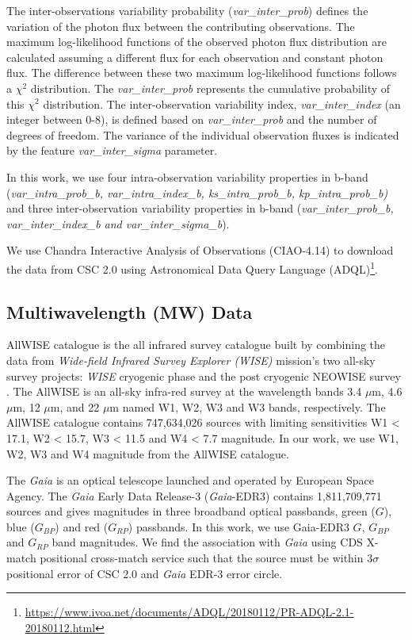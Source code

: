 \documentclass[fleqn,usenatbib]{mnras}
\begin{document}
 The inter-observations variability probability ({\em var\_inter\_prob}) 
 defines the variation of the photon flux between the contributing observations. The maximum log-likelihood functions of the observed photon flux distribution are calculated assuming a different flux for each observation and constant photon flux. The difference between these two maximum log-likelihood functions follows a $\chi^2$ distribution. The {\em var\_inter\_prob} represents the cumulative probability of this $\chi^2$ distribution. The inter-observation variability index, {\em var\_inter\_index} (an integer between 0-8), is defined based on {\em var\_inter\_prob} and the number of degrees of freedom. The variance of the individual observation fluxes is indicated by the feature {\em var\_inter\_sigma} parameter.

 In this work, we use four intra-observation variability properties in b-band ({\em var\_intra\_prob\_b, var\_intra\_index\_b, ks\_intra\_prob\_b, kp\_intra\_prob\_b)} and three inter-observation variability properties in b-band ({\em var\_inter\_prob\_b, var\_inter\_index\_b and var\_inter\_sigma\_b}).
  
 We use Chandra Interactive Analysis of Observations (CIAO-4.14) \citep{2006SPIE.6270E..1VF} to download the data from CSC 2.0 using Astronomical Data Query Language (ADQL)\footnote{\url{https://www.ivoa.net/documents/ADQL/20180112/PR-ADQL-2.1-20180112.html}}. 

\subsection{Multiwavelength (MW) Data}\label{sec:mw-data}

AllWISE catalogue \citep{2014yCat.2328....0C} is the all infrared survey catalogue built by combining the data from {\em Wide-field Infrared Survey Explorer (WISE)} mission's two all-sky survey projects: {\em WISE} cryogenic phase \citep{2010AJ....140.1868W} and the post cryogenic NEOWISE survey \citep{2011ApJ...731...53M}. The AllWISE  is an all-sky infra-red survey at the wavelength bands 3.4 $\mu$m, 4.6 $\mu$m, 12 $\mu$m, and 22 $\mu$m named W1, W2, W3 and W3 bands, respectively. The AllWISE catalogue contains 747,634,026 sources with limiting sensitivities W1 < 17.1, W2 < 15.7, W3 < 11.5 and W4 < 7.7 magnitude. In our work, we use W1, W2, W3 and W4 magnitude from the AllWISE catalogue.

The {\em Gaia} \citep{2016A&A...595A...1G} is an optical telescope launched and operated by European Space Agency. The {\em Gaia} Early Data Release-3 ({\em Gaia}-EDR3) \citep{2021A&A...649E...1F} contains 1,811,709,771 sources and gives magnitudes in three broadband optical passbands, green ($G$), blue ($G_{BP}$) and red ($G_{RP}$) passbands. In this work, we use Gaia-EDR3 $G$, $G_{BP}$ and $G_{RP}$ band magnitudes. We find the association with \textit{Gaia} using CDS X-match positional cross-match service \citep{boch2014cds} such that the source must be within $3\sigma$ positional error of CSC 2.0 and \textit{Gaia} EDR-3 error circle.
\end{document}
